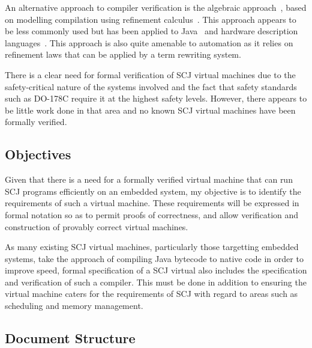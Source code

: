 \documentclass[a4paper,12pt]{article}
\begin{document}
An alternative approach to compiler verification is the algebraic
approach~\cite{hoare1991, sampaio1993}, based on modelling compilation using
refinement calculus~\cite{back1981, morgan1990, morris1987}. This approach
appears to be less commonly used but has been applied to Java~\cite{duran2005,
  duran2010} and hardware description languages~\cite{perna2010,
  perna2011}. This approach is also quite amenable to automation as it relies on
refinement laws that can be applied by a term rewriting system.

There is a clear need for formal verification of SCJ virtual machines due to the
safety-critical nature of the systems involved and the fact that safety
standards such as DO-178C require it at the highest safety levels. However,
there appears to be little work done in that area and no known SCJ virtual
machines have been formally verified.


\subsection{Objectives}

Given that there is a need for a formally verified virtual machine that can run
SCJ programs efficiently on an embedded system, my objective is to identify the
requirements of such a virtual machine. These requirements will be expressed in
formal notation so as to permit proofs of correctness, and allow verification
and construction of provably correct virtual machines.

As many existing SCJ virtual machines, particularly those targetting embedded
systems, take the approach of compiling Java bytecode to native code in order to
improve speed, formal specification of a SCJ virtual also includes the
specification and verification of such a compiler. This must be done in addition
to ensuring the virtual machine caters for the requirements of SCJ with regard
to areas such as scheduling and memory management.

\subsection{Document Structure}

\end{document}
